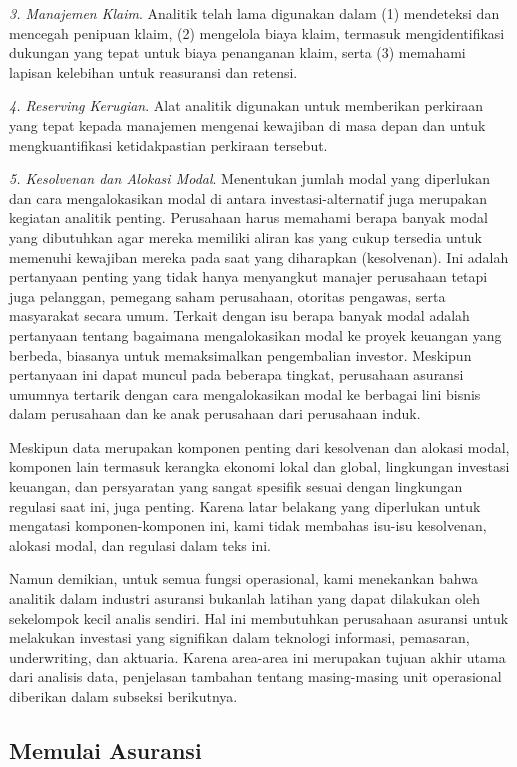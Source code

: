 \documentclass[
]{book}
\begin{document}
\emph{3. Manajemen Klaim}. Analitik telah lama digunakan dalam (1) mendeteksi dan mencegah penipuan klaim, (2) mengelola biaya klaim, termasuk mengidentifikasi dukungan yang tepat untuk biaya penanganan klaim, serta (3) memahami lapisan kelebihan untuk reasuransi dan retensi.

\emph{4. Reserving Kerugian}. Alat analitik digunakan untuk memberikan perkiraan yang tepat kepada manajemen mengenai kewajiban di masa depan dan untuk mengkuantifikasi ketidakpastian perkiraan tersebut.

\emph{5. Kesolvenan dan Alokasi Modal}. Menentukan jumlah modal yang diperlukan dan cara mengalokasikan modal di antara investasi-alternatif juga merupakan kegiatan analitik penting. Perusahaan harus memahami berapa banyak modal yang dibutuhkan agar mereka memiliki aliran kas yang cukup tersedia untuk memenuhi kewajiban mereka pada saat yang diharapkan (kesolvenan). Ini adalah pertanyaan penting yang tidak hanya menyangkut manajer perusahaan tetapi juga pelanggan, pemegang saham perusahaan, otoritas pengawas, serta masyarakat secara umum. Terkait dengan isu berapa banyak modal adalah pertanyaan tentang bagaimana mengalokasikan modal ke proyek keuangan yang berbeda, biasanya untuk memaksimalkan pengembalian investor. Meskipun pertanyaan ini dapat muncul pada beberapa tingkat, perusahaan asuransi umumnya tertarik dengan cara mengalokasikan modal ke berbagai lini bisnis dalam perusahaan dan ke anak perusahaan dari perusahaan induk.

Meskipun data merupakan komponen penting dari kesolvenan dan alokasi modal, komponen lain termasuk kerangka ekonomi lokal dan global, lingkungan investasi keuangan, dan persyaratan yang sangat spesifik sesuai dengan lingkungan regulasi saat ini, juga penting. Karena latar belakang yang diperlukan untuk mengatasi komponen-komponen ini, kami tidak membahas isu-isu kesolvenan, alokasi modal, dan regulasi dalam teks ini.

Namun demikian, untuk semua fungsi operasional, kami menekankan bahwa analitik dalam industri asuransi bukanlah latihan yang dapat dilakukan oleh sekelompok kecil analis sendiri. Hal ini membutuhkan perusahaan asuransi untuk melakukan investasi yang signifikan dalam teknologi informasi, pemasaran, underwriting, dan aktuaria. Karena area-area ini merupakan tujuan akhir utama dari analisis data, penjelasan tambahan tentang masing-masing unit operasional diberikan dalam subseksi berikutnya.

\hypertarget{memulai-asuransi}{%
\subsection{Memulai Asuransi}\label{memulai-asuransi}}
\end{document}
